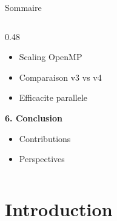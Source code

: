\documentclass[aspectratio=169,9pt]{beamer}
\begin{document}
\begin{frame}{Sommaire}
\begin{columns}[T]
\begin{column}{0.48\textwidth}
\begin{itemize}
                \item Scaling OpenMP
                \item Comparaison v3 vs v4
                \item Efficacite parallele
            \end{itemize}
            \vspace{0.2cm}
            \textbf{6. Conclusion}
            \begin{itemize}\small
                \item Contributions
                \item Perspectives
            \end{itemize}
        \end{column}
    \end{columns}
\end{frame}

\section{Introduction}
\end{document}
